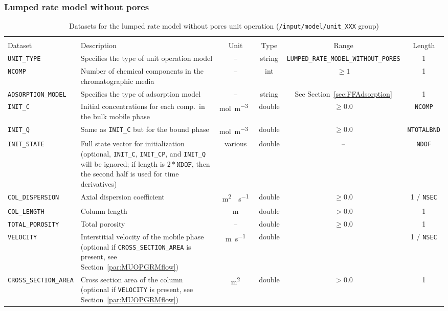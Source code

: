 \FloatBarrier
\subsubsection{Lumped rate model without pores}

\begin{table}[!ht]
\footnotesize
\begin{tabu}to \linewidth[m]{lX[m]cccc} \toprule
{} \\
\rowfont[c]\normalfont Dataset & Description & Unit & Type & Range & Length \everyrow{\midrule}\\
\texttt{UNIT\_TYPE} & Specifies the type of unit operation model & -- & string & \texttt{LUMPED\_RATE\_MODEL\_WITHOUT\_PORES} & 1 \\
\texttt{NCOMP}& Number of chemical components in the chromatographic media & -- & int  & $\geq 1$ & 1 \\
\texttt{ADSORPTION\_MODEL} & Specifies the type of adsorption model & -- & string & See Section~\ref{sec:FFAdsorption} & 1 \\
\texttt{INIT\_C} & Initial concentrations for each comp.\ in the bulk mobile phase & \si{\mol\per\cubic\metre{}} & double & $\geq 0.0$ & \texttt{NCOMP}\\
\texttt{INIT\_Q} & Same as \texttt{INIT\_C} but for the bound phase & \si{\mol\per\cubic\metre{}} & double & $\geq 0.0$ & \texttt{NTOTALBND}\\
\texttt{INIT\_STATE} & Full state vector for initialization (optional, \texttt{INIT\_C}, \texttt{INIT\_CP}, and \texttt{INIT\_Q} will be ignored; if length is $2 * \texttt{NDOF}$, then the second half is used for time derivatives) & various & double & -- & \texttt{NDOF} \\
\texttt{COL\_DISPERSION} & Axial dispersion coefficient & \si{\square\metre{}\per\second} & double & $\geq 0.0$ & 1 / \texttt{NSEC}\\
\texttt{COL\_LENGTH} & Column length & \si{\metre} & double & $> 0.0$ & 1\\
\texttt{TOTAL\_POROSITY} & Total porosity & -- & double & $\geq 0.0$ & 1\\
\texttt{VELOCITY} & Interstitial velocity of the mobile phase (optional if \texttt{CROSS\_SECTION\_AREA} is present, see Section~\ref{par:MUOPGRMflow}) & \si{\metre\per\second} & double & & 1 / \texttt{NSEC} \\
\texttt{CROSS\_SECTION\_AREA} & Cross section area of the column (optional if \texttt{VELOCITY} is present, see Section~\ref{par:MUOPGRMflow}) & \si{\square\metre} & double & $> 0.0$ & 1
\everyrow{}\\
\bottomrule
\end{tabu}
\caption[Datasets for the lumped rate model without pores unit operation]{\label{tab:FFModelUnitOpLRM}Datasets for the lumped rate model without pores unit operation (\texttt{/input/model/unit\_XXX} group)}
\end{table}

